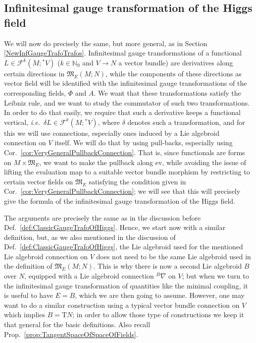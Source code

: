 \subsection{Infinitesimal gauge transformation of the Higgs field}

We will now do precisely the same, but more general, as in Section \ref{NewInfGaugeTrafoTrafos}. Infinitesimal gauge transformations of a functional $L \in \mathcal{F}^k(M; {}^*V)$ ($k \in \mathbb{N}_0$ and $V \to N$ a vector bundle) are derivatives along certain directions in $\mathfrak{M}_E(M; N)$, while the components of these directions as vector field will be identified with the infinitesimal gauge transformations of the corresponding fields, $\Phi$ and $A$. We want that these transformations satisfy the Leibniz rule, and we want to study the commutator of such two transformations. In order to do that easily, we require that such a derivative keeps a functional vertical, \textit{i.e.}~$\delta L \in \mathcal{F}^k(M; {}^*V)$, where $\delta$ denotes such a transformation, and for this we will use connections, especially ones induced by a Lie algebroid connection on $V$ itself. We will do that by using pull-backs, especially using Cor.~\ref{cor:VeryGeneralPullbackConnection}. That is, since functionals are forms on $M \times \mathfrak{M}_E$, we want to make the pullback along $\mathrm{ev}$, while avoiding the issue of lifting the evaluation map to a suitable vector bundle morphism by restricting to certain vector fields on $\mathfrak{M}_E$ satisfying the condition given in Cor.~\ref{cor:VeryGeneralPullbackConnection}; we will see that this will precisely give the formula of the infinitesimal gauge transformation of the Higgs field.

The arguments are precisely the same as in the discussion before Def.~\ref{def:ClassicGaugeTrafoOfHiggs}. Hence, we start now with a similar definition, but, as we also mentioned in the discussion of Def.~\ref{def:ClassicGaugeTrafoOfHiggs}, the Lie algebroid used for the mentioned Lie algebroid connection on $V$ does not need to be the same Lie algebroid used in the definition of $\mathfrak{M}_E(M;N)$. This is why there is now a second Lie algebroid $B$ over $N$, equipped with a Lie algebroid connection ${}^B\nabla$ on $V$; but when we turn to the infinitesimal gauge transformation of quantities like the minimal coupling, it is useful to have $E=B$, which we are then going to assume. However, one may want to do a similar construction using a typical vector bundle connection on $V$ which implies $B=\mathrm{T}N$; in order to allow those type of constructions we keep it that general for the basic definitions. Also recall Prop.~\ref{prop:TangentSpaceOfSpaceOfFields}.

